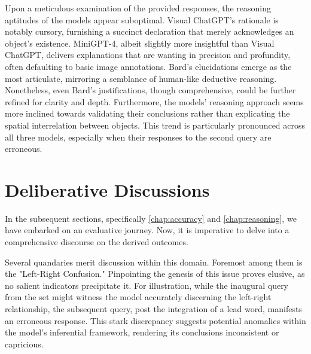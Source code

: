 \documentclass[twocolumn,11pt]{report}
\begin{document}
Upon a meticulous examination of the provided responses, the reasoning aptitudes of the models appear suboptimal. Visual ChatGPT's rationale is notably cursory, furnishing a succinct declaration that merely acknowledges an object's existence. MiniGPT-4, albeit slightly more insightful than Visual ChatGPT, delivers explanations that are wanting in precision and profundity, often defaulting to basic image annotations. Bard's elucidations emerge as the most articulate, mirroring a semblance of human-like deductive reasoning. Nonetheless, even Bard's justifications, though comprehensive, could be further refined for clarity and depth. Furthermore, the models' reasoning approach seems more inclined towards validating their conclusions rather than explicating the spatial interrelation between objects. This trend is particularly pronounced across all three models, especially when their responses to the second query are erroneous.

\section{Deliberative Discussions}\label{chap:discussion}

In the subsequent sections, specifically \ref{chap:accuracy} and \ref{chap:reasoning}, we have embarked on an evaluative journey. Now, it is imperative to delve into a comprehensive discourse on the derived outcomes.

Several quandaries merit discussion within this domain. Foremost among them is the "Left-Right Confusion." Pinpointing the genesis of this issue proves elusive, as no salient indicators precipitate it. For illustration, while the inaugural query from the set might witness the model accurately discerning the left-right relationship, the subsequent query, post the integration of a lead word, manifests an erroneous response. This stark discrepancy suggests potential anomalies within the model's inferential framework, rendering its conclusions inconsistent or capricious.
\end{document}
